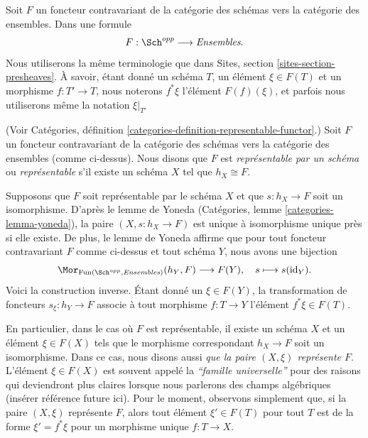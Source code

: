 \medskip\noindent
Soit $F$ un foncteur contravariant de la catégorie des schémas
vers la catégorie des ensembles. Dans une formule
$$
F : \Sch^{opp}
\longrightarrow
\textit{Ensembles}.
$$
Nous utiliserons la même terminologie que dans Sites,
section \ref{sites-section-presheaves}. À savoir, étant donné
un schéma $T$, un élément $\xi \in F(T)$ et un morphisme $f : T'
\to T$, nous noterons $f^*\xi$ l'élément $F(f)(\xi)$, et parfois
nous utiliserons même la notation $\xi|_{T'}$

\begin{definition}
\label{definition-representable-functor}
(Voir Catégories, définition \ref{categories-definition-representable-functor}.) Soit
$F$ un foncteur contravariant de la catégorie des schémas
vers la catégorie des ensembles (comme ci-dessus).
Nous disons que $F$ est {\it représentable par un
schéma} ou {\it représentable} s'il existe un schéma
$X$ tel que $h_X \cong F$.
\end{definition}

\noindent
Supposons que $F$ soit représentable par le schéma $X$ et que $s : h_X
\to F$ soit un isomorphisme. D'après le
lemme de Yoneda (Catégories, lemme \ref{categories-lemma-yoneda}),
la paire $(X, s : h_X \to F)$ est unique à isomorphisme
unique près si elle existe. De
plus, le lemme de Yoneda affirme que pour
tout foncteur contravariant $F$ comme ci-dessus
et tout schéma $Y$, nous avons une bijection
$$
\Mor_{\text{Fun}(\Sch^{opp}, \textit{Ensembles})} (h_Y, F)
\longrightarrow
F(Y), \quad
s \longmapsto s(\text{id}_Y).
$$
Voici la construction inverse. Étant donné un $\xi \in F(Y)$,
la transformation de foncteurs $s_\xi : h_Y \to
F$ associe à tout morphisme $f : T \to Y$
l'élément $f^*\xi \in F(T)$.

\medskip\noindent
En particulier, dans le cas où $F$ est représentable, il existe un schéma
$X$ et un élément $\xi \in F(X)$ tels que le morphisme correspondant
$h_X \to F$ soit un isomorphisme. Dans ce
cas, nous disons aussi {\it que la paire $(X, \xi)$ représente $F$}.
L'élément $\xi \in F(X)$ est
souvent appelé la {\it ``famille universelle''} pour des raisons qui deviendront
plus claires lorsque nous parlerons des champs algébriques (insérer référence
future ici). Pour le moment, observons simplement que, si la paire $(X, \xi)$
représente $F$, alors tout élément $\xi' \in F(T)$ pour tout $T$ est de
la forme $\xi' = f^*\xi$ pour un morphisme unique $f : T \to X$.

